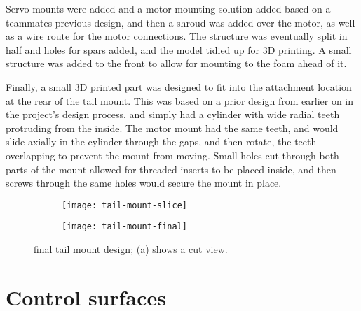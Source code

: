 \documentclass[../../main.tex]{subfiles}
\begin{document}
Servo mounts were added and a motor mounting solution added based on a teammates previous design, and then a shroud was added over the motor, as well as a wire route for the motor connections.
The structure was eventually split in half and holes for spars added, and the model tidied up for 3D printing. 
A small structure was added to the front to allow for mounting to the foam ahead of it.

Finally, a small 3D printed part was designed to fit into the attachment location at the rear of the tail mount.
This was based on a prior design from earlier on in the project's design process, and simply had a cylinder with wide radial teeth protruding from the inside.
The motor mount had the same teeth, and would slide axially in the cylinder through the gaps, and then rotate, the teeth overlapping to prevent the mount from moving.
Small holes cut through both parts of the mount allowed for threaded inserts to be placed inside, and then screws through the same holes would secure the mount in place. 


\begin{figure}[H]
    \centering
    \begin{subfigure}[b]{0.49\columnwidth}
        \centering
        \texttt{[image: tail-mount-slice]}
        \caption{}
        \label{fig:tail-mount-design:slice}
    \end{subfigure}
    \hfill
    \begin{subfigure}[b]{0.49\columnwidth}
        \centering
        \texttt{[image: tail-mount-final]}
        \caption{}
        \label{fig:tail-mount-design:whole}
    \end{subfigure}
    
    \caption{final tail mount design; (a) shows a cut view.}
    \label{fig:tail-mount-design}
\end{figure} 


\section{Control surfaces} \label{sec:final-design-proposal:control-surfaces}
\end{document}
